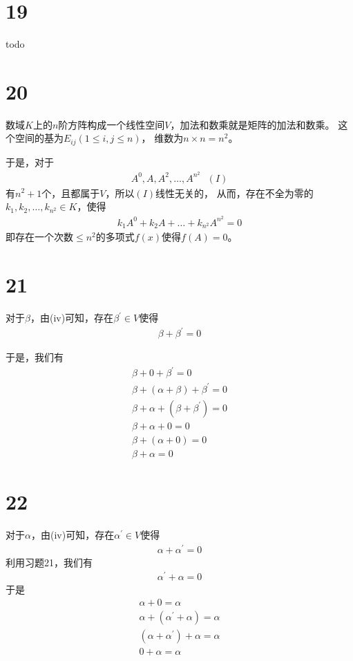 \documentclass{article}
\begin{document}
\section*{19}

todo

\section*{20}

数域$K$上的$n$阶方阵构成一个线性空间$V$，加法和数乘就是矩阵的加法和数乘。
这个空间的基为$E_{ij} (1 \leq i,j \leq n)$，
维数为$n \times n = n^2$。

于是，对于
\begin{align*}
  A^{0}, A, A^{2}, \dots, A^{n^2} \ \ \ (I)
\end{align*}
有$n^2 + 1$个，且都属于$V$，所以$(I)$线性无关的，
从而，存在不全为零的$k_1, k_2, \dots, k_{n^2} \in K$，使得
\begin{align*}
  k_1 A^{0} + k_2 A + \dots + k_{n^2} A^{n^2} = 0
\end{align*}
即存在一个次数$\leq n^2$的多项式$f(x)$使得$f(A) = 0$。

\section*{21}

对于$\beta$，由(iv)可知，存在$\beta^\prime \in V$使得
\begin{align*}
  \beta + \beta^\prime = 0
\end{align*}

于是，我们有
\begin{align*}
  \beta + 0 + \beta^\prime = 0                \\
  \beta + (\alpha + \beta) + \beta^\prime = 0 \\
  \beta + \alpha + (\beta + \beta^\prime) = 0 \\
  \beta + \alpha + 0 = 0                      \\
  \beta + (\alpha + 0) = 0                    \\
  \beta + \alpha  = 0
\end{align*}

\section*{22}
对于$\alpha$，由(iv)可知，存在$\alpha^\prime \in V$使得
\begin{align*}
  \alpha + \alpha^\prime = 0
\end{align*}
利用习题21，我们有
\begin{align*}
  \alpha^\prime + \alpha = 0
\end{align*}
于是
\begin{align*}
  \alpha + 0 = \alpha                        \\
  \alpha + (\alpha^\prime + \alpha) = \alpha \\
  (\alpha + \alpha^\prime) + \alpha = \alpha \\
  0 + \alpha = \alpha
\end{align*}
\end{document}
